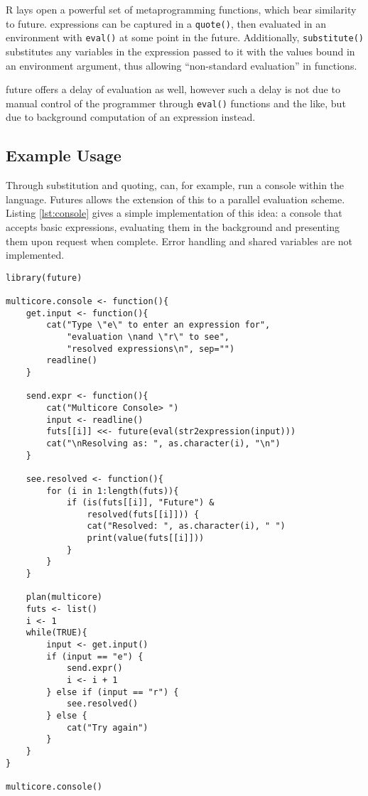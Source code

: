R lays open a powerful set of metaprogramming functions, which bear
similarity to future. \R expressions can be captured in a
\texttt{quote()}, then evaluated in an
environment with \texttt{eval()} at some point
in the future. Additionally,
\texttt{substitute()} substitutes any variables
in the expression passed to it with the values bound in an environment
argument, thus allowing ``non-standard evaluation'' in functions.

future offers a delay of evaluation as well, however such a delay is not
due to manual control of the programmer through
\texttt{eval()} functions and the like, but due
to background computation of an expression instead.

\hypertarget{sec:examples}{%
    \subsection{Example Usage}\label{sec:examples}}

Through substitution and quoting, \R can, for example, run a console
within the language. Futures allows the extension of this to a parallel
evaluation scheme. Listing \cref{lst:console} gives a simple
implementation of this idea: a console that accepts basic expressions,
evaluating them in the background and presenting them upon request when
complete. Error handling and shared variables are not implemented.

\begin{listing}
    \begin{verbatim}
library(future)

multicore.console <- function(){
    get.input <- function(){
        cat("Type \"e\" to enter an expression for",
            "evaluation \nand \"r\" to see",
            "resolved expressions\n", sep="")
        readline()
    }

    send.expr <- function(){
        cat("Multicore Console> ")
        input <- readline()
        futs[[i]] <<- future(eval(str2expression(input)))
        cat("\nResolving as: ", as.character(i), "\n")
    }

    see.resolved <- function(){
        for (i in 1:length(futs)){
            if (is(futs[[i]], "Future") &
                resolved(futs[[i]])) {
                cat("Resolved: ", as.character(i), " ")
                print(value(futs[[i]]))
            }
        }
    }

    plan(multicore)
    futs <- list()
    i <- 1
    while(TRUE){
        input <- get.input()
        if (input == "e") {
            send.expr()
            i <- i + 1
        } else if (input == "r") {
            see.resolved()
        } else {
            cat("Try again")
        }
    }
}

multicore.console()
\end{verbatim}
    \caption{Usage of future to implement a basic multicore console}
    \label{lst:console}
\end{listing}

